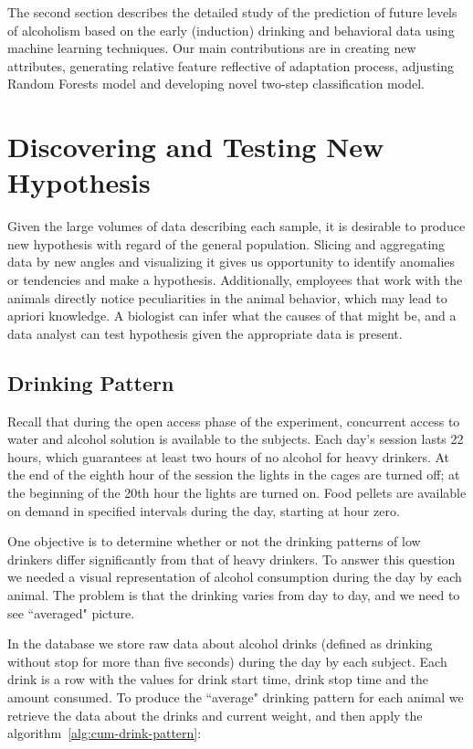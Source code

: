 The second section describes the detailed study of the prediction of future levels of alcoholism based on the early (induction) drinking and behavioral data using machine learning techniques. Our main contributions are in creating new attributes, generating relative feature reflective of adaptation process, adjusting Random Forests model and developing novel two-step classification model. 

\section{Discovering and Testing New Hypothesis}
	Given the large volumes of data describing each sample, it is desirable to produce new hypothesis with regard of the general population. Slicing and aggregating data by new angles and visualizing it gives us opportunity to identify anomalies or tendencies and make a hypothesis. Additionally, employees that work with the animals directly notice peculiarities in the animal behavior, which may lead to apriori knowledge. A biologist can infer what the causes of that might be, and a data analyst can test hypothesis given the appropriate data is present. 	
	
\pagebreak	
	\subsection{Drinking Pattern}
	Recall that during the open access phase of the experiment, concurrent access to water and alcohol solution is available to the subjects. Each day's session lasts 22 hours, which guarantees at least two hours of no alcohol for heavy drinkers. At the end of the eighth hour of the session the lights in the cages are turned off; at the beginning of the 20th hour the lights are turned on. Food pellets are available on demand in specified intervals during the day, starting at hour zero. 
	
	One objective is to determine whether or not the drinking patterns of low drinkers differ significantly from that of heavy drinkers. To answer this question we needed a visual representation of alcohol consumption during the day by each animal. The problem is that the drinking varies from day to day, and we need to see ``averaged" picture. 
	
	In the database we store raw data about alcohol drinks (defined as drinking without stop for more than five seconds) during the day by each subject. Each drink is a row with the values for drink start time, drink stop time and the amount consumed. To produce the ``average" drinking pattern for each animal we retrieve the data about the drinks and current weight, and then apply the algorithm~\ref{alg:cum-drink-pattern}:
	
